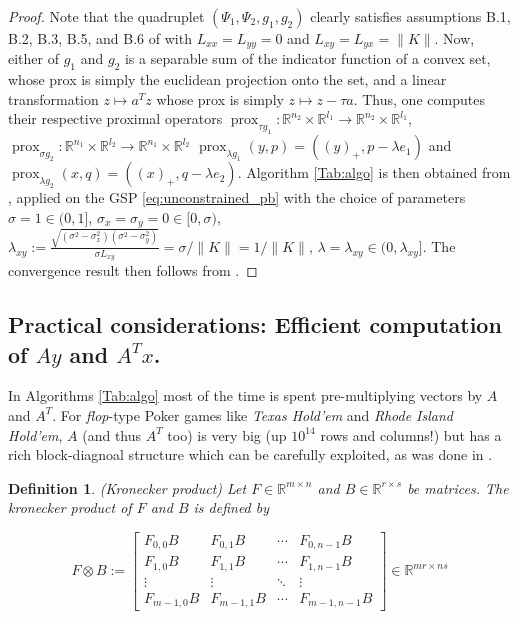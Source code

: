 \documentclass{article} %
\newtheorem{definition}[theorem]{Definition}
\DeclareMathOperator{\prox}{prox}
\begin{document}
\begin{proof}
Note that the quadruplet $(\Psi_1, \Psi_2, g_1, g_2)$ clearly satisfies
assumptions B.1, B.2, B.3, B.5, and B.6 of \cite{he2013accelerating}
with $L_{xx} = L_{yy} = 0$ and $L_{xy} = L_{yx} = \|K\|$. Now,
either of $g_1$ and $g_2$ is a separable sum of
the indicator function of a convex set, whose prox is simply the
euclidean projection onto the set,  and a linear transformation $z
\mapsto a^Tz$ whose prox is simply $z \mapsto z - \tau a$. Thus,  one
computes their respective proximal operators $\prox_{\tau g_1} :
\mathbb{R}^{n_2} \times \mathbb{R}^{l_1} \rightarrow \mathbb{R}^{n_2}
\times \mathbb{R}^{l_1}$, $\prox_{\sigma g_2}: \mathbb{R}^{n_1} \times
\mathbb{R}^{l_2} \rightarrow \mathbb{R}^{n_1} \times \mathbb{R}^{l_2}$
$\prox_{\lambda g_1}(y, p) = ((y)_+, p - \lambda e_1)$ and $\prox_{\lambda
  g_2}(x, q) = ((x)_+, q - \lambda e_2)$. Algorithm \ref{Tab:algo} is
then obtained from \cite[Algorithm
  T-BD]{he2013accelerating}, applied on the GSP \eqref{eq:unconstrained_pb}
 with the choice of parameters $\sigma = 1 \in (0, 1]$, $\sigma_x =
         \sigma_y = 0 \in [0, \sigma)$,
 $\lambda_{xy} := \frac{\sqrt{(\sigma^2 - \sigma_x^2)(\sigma^2 -
               \sigma_y^2)}}{\sigma L_{xy}} = \sigma / \|K\| =
           1/\|K\|$, $\lambda = \lambda_{xy} \in (0,
           \lambda_{xy}]$. The convergence result then follows from
         \cite[Theorem 4.2]{he2013accelerating}.
\end{proof}
\subsection{Practical considerations: Efficient computation of $Ay$ and $A^Tx$.}
In Algorithms \ref{Tab:algo} most of the time is spent
pre-multiplying vectors by $A$ and $A^T$. For \textit{flop}-type Poker
games like \textit{Texas Hold'em} and  \textit{Rhode Island Hold'em},
$A$ (and thus $A^T$ too)  is very big (up $10^{14}$ rows and columns!)
but has a rich block-diagnoal structure which can be carefully
exploited, as was done in \cite{hoda2010smoothing}.


\begin{definition}(Kronecker product)
Let $F \in \mathbb{R}^{m \times n}$ and $B \in \mathbb{R}^{r \times
  s}$ be matrices. The kronecker product of $F$ and $B$ is defined by

\begin{equation}
F \otimes B:=\left[
\begin{array}{cccc}
F_{0,0}B & F_{0,1}B & \cdots & F_{0,n-1}B \\
F_{1,0}B & F_{1,1}B & \cdots & F_{1,n-1}B \\
\vdots & \vdots & \ddots & \vdots\\
F_{m-1,0}B & F_{m-1,1}B & \cdots & F_{m-1,n-1}B 
\end{array}\right] \in \mathbb{R}^{mr \times ns}
\end{equation}
\end{definition}
\end{document}
